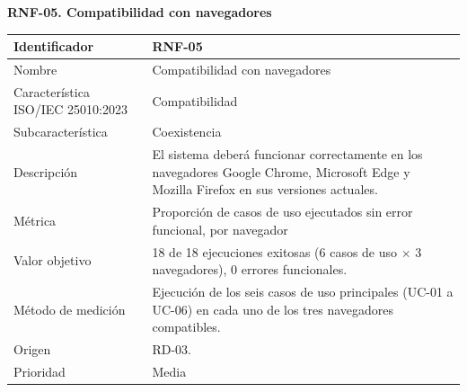 \documentclass[12pt,a4paper]{article}
\begin{document}
\begin{minipage}{\linewidth}
\bigskip
\noindent\textbf{RNF-05. Compatibilidad con navegadores}
\label{tab:RNF-05}

\begin{center}
\begin{tabular}{|p{4.2cm}|p{10cm}|}
\hline
Identificador & RNF-05 \\
\hline
Nombre & Compatibilidad con navegadores \\
\hline
Característica ISO/IEC 25010:2023 & Compatibilidad \\
\hline
Subcaracterística & Coexistencia \\
\hline
Descripción & El sistema deberá funcionar correctamente en los navegadores Google Chrome, Microsoft Edge y Mozilla Firefox en sus versiones actuales. \\
\hline
Métrica & Proporción de casos de uso ejecutados sin error funcional, por navegador \\
\hline
Valor objetivo & 18 de 18 ejecuciones exitosas (6 casos de uso $\times$ 3 navegadores), 0 errores funcionales. \\
\hline
Método de medición & Ejecución de los seis casos de uso principales (UC-01 a UC-06) en cada uno de los tres navegadores compatibles. \\
\hline
Origen & RD-03. \\
\hline
Prioridad & Media \\
\hline
\end{tabular}
\end{center}
\end{minipage}
\end{document}
